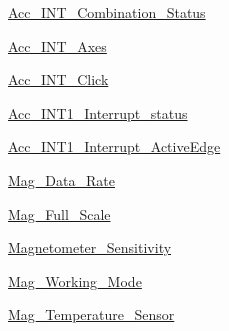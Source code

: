 \begin{DoxyCompactItemize}
\item 
\hyperlink{group__Acc__INT__Combination__Status}{Acc\+\_\+\+I\+N\+T\+\_\+\+Combination\+\_\+\+Status}
\item 
\hyperlink{group__Acc__INT__Axes}{Acc\+\_\+\+I\+N\+T\+\_\+\+Axes}
\item 
\hyperlink{group__Acc__INT__Click}{Acc\+\_\+\+I\+N\+T\+\_\+\+Click}
\item 
\hyperlink{group__Acc__INT1__Interrupt__status}{Acc\+\_\+\+I\+N\+T1\+\_\+\+Interrupt\+\_\+status}
\item 
\hyperlink{group__Acc__INT1__Interrupt__ActiveEdge}{Acc\+\_\+\+I\+N\+T1\+\_\+\+Interrupt\+\_\+\+Active\+Edge}
\item 
\hyperlink{group__Mag__Data__Rate}{Mag\+\_\+\+Data\+\_\+\+Rate}
\item 
\hyperlink{group__Mag__Full__Scale}{Mag\+\_\+\+Full\+\_\+\+Scale}
\item 
\hyperlink{group__Magnetometer__Sensitivity}{Magnetometer\+\_\+\+Sensitivity}
\item 
\hyperlink{group__Mag__Working__Mode}{Mag\+\_\+\+Working\+\_\+\+Mode}
\item 
\hyperlink{group__Mag__Temperature__Sensor}{Mag\+\_\+\+Temperature\+\_\+\+Sensor}
\end{DoxyCompactItemize}
